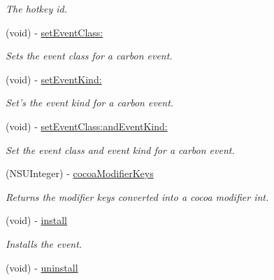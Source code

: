 \begin{DoxyCompactItemize}
\begin{DoxyCompactList}\small\item\em The hotkey id. \item\end{DoxyCompactList}\item 
(void) -\/ \hyperlink{interface_g_d_carbon_event_ae4c7f30d07acf8e89dc778dde1dedc8d}{setEventClass:}
\begin{DoxyCompactList}\small\item\em Sets the event class for a carbon event. \item\end{DoxyCompactList}\item 
(void) -\/ \hyperlink{interface_g_d_carbon_event_ab62393c9ce0c0d7caed4dbe9f59dad04}{setEventKind:}
\begin{DoxyCompactList}\small\item\em Set's the event kind for a carbon event. \item\end{DoxyCompactList}\item 
(void) -\/ \hyperlink{interface_g_d_carbon_event_a4e873892d751951433ef76ae3de88fad}{setEventClass:andEventKind:}
\begin{DoxyCompactList}\small\item\em Set the event class and event kind for a carbon event. \item\end{DoxyCompactList}\item 
\hypertarget{interface_g_d_carbon_event_aeef71147d2ade9d185211c84816ff88d}{
(NSUInteger) -\/ \hyperlink{interface_g_d_carbon_event_aeef71147d2ade9d185211c84816ff88d}{cocoaModifierKeys}}
\label{interface_g_d_carbon_event_aeef71147d2ade9d185211c84816ff88d}

\begin{DoxyCompactList}\small\item\em Returns the modifier keys converted into a cocoa modifier int. \item\end{DoxyCompactList}\item 
\hypertarget{interface_g_d_carbon_event_a852143928db268680e507f464807c659}{
(void) -\/ \hyperlink{interface_g_d_carbon_event_a852143928db268680e507f464807c659}{install}}
\label{interface_g_d_carbon_event_a852143928db268680e507f464807c659}

\begin{DoxyCompactList}\small\item\em Installs the event. \item\end{DoxyCompactList}\item 
\hypertarget{interface_g_d_carbon_event_a7d966ae0c8dde52ce77e43daf777921d}{
(void) -\/ \hyperlink{interface_g_d_carbon_event_a7d966ae0c8dde52ce77e43daf777921d}{uninstall}}
\label{interface_g_d_carbon_event_a7d966ae0c8dde52ce77e43daf777921d}


\end{DoxyCompactItemize}
